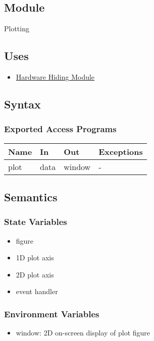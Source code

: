 \documentclass[12pt, titlepage]{article}
\begin{document}
\subsection{Module}

Plotting

\subsection{Uses}
\begin{itemize}
    \item \hyperref[Mod:HH]{Hardware Hiding Module}
\end{itemize}

\subsection{Syntax}

\subsubsection{Exported Access Programs}

\begin{center}
\begin{tabular}{p{2cm} p{4cm} p{4cm} p{2cm}}
\hline
\textbf{Name} & \textbf{In} & \textbf{Out} & \textbf{Exceptions} \\
\hline
plot & data & window & - \\
\hline
\end{tabular}
\end{center}

\subsection{Semantics}

\subsubsection{State Variables}
\begin{itemize}
    \item figure
    \item 1D plot axis
    \item 2D plot axis
    \item event handler
\end{itemize}

\subsubsection{Environment Variables}
\begin{itemize}
    \item window: 2D on-screen display of plot figure
\end{itemize}
\end{document}
